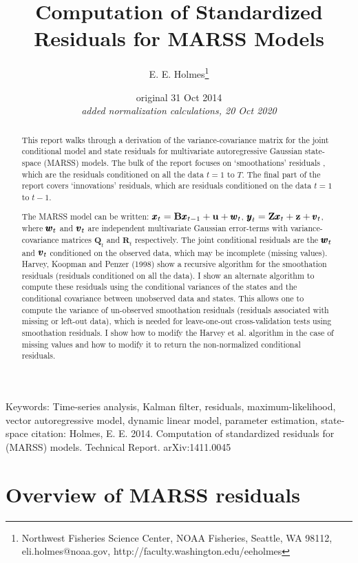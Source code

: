 \documentclass[]{article}
\def\UPS{\mbox{\boldmath $\Upsilon$}}
\def\XI{\mbox{\boldmath $\Xi$}}
\def\BB{\mbox{$\mathbf B$}}	\def\bb{\mbox{$\mathbf b$}} \def\Bb{\mbox{$\mathbf J$}} \def\Ba{\mbox{$\mathbf L$}} \def\Bm{\UPS}
\def\QQ{\mbox{$\mathbf Q$}}	 \def\qq{\mbox{$\mathbf q$}} \def\Qb{\mbox{$\mathbf G$}}  \def\Qm{\mathbb{Q}}
\def\RR{\mbox{$\mathbf R$}}	 \def\rr{\mbox{$\mathbf r$}} \def\Rb{\mbox{$\mathbf H$}}	\def\Rm{\mathbb{R}}
\def\ZZ{\mbox{$\mathbf Z$}}	\def\zz{\mbox{$\mathbf z$}}	\def\Zb{\mbox{$\mathbf M$}} \def\Za{\mbox{$\mathbf N$}} \def\Zm{\XI}
\begin{document}

\author{E. E. Holmes\footnote{Northwest Fisheries Science Center, NOAA Fisheries, Seattle, WA 98112, 
       eli.holmes@noaa.gov, http://faculty.washington.edu/eeholmes}}
\title{Computation of Standardized Residuals for MARSS Models}
\date{original 31 Oct 2014 \\ 
\small{\emph{added normalization calculations, 20 Oct 2020}}}
\maketitle
\begin{abstract}
This report walks through a derivation of the variance-covariance matrix for the joint conditional model and state residuals for multivariate autoregressive Gaussian state-space (MARSS) models. The bulk of the report focuses on `smoothations' residuals \citep{Harveyetal1998}, which are the residuals conditioned on all the data $t=1$ to $T$. The final part of the report covers `innovations' residuals, which are residuals conditioned on the data $t=1$ to $t-1$. 

The MARSS model can be written: $\xx_t=\BB\xx_{t-1}+\uu+\ww_t$, $\yy_t=\ZZ\xx_t+\zz+\vv_t$, where $\mbox{$\pmb{w}$}_t$ and $\mbox{$\pmb{v}$}_t$ are independent multivariate Gaussian error-terms with variance-covariance matrices $\QQ_t$ and $\RR_t$ respectively. The joint conditional residuals are the $\mbox{$\pmb{w}$}_t$ and $\mbox{$\pmb{v}$}_t$ conditioned on the observed data, which may be incomplete (missing values). Harvey, Koopman and Penzer (1998) show a recursive algorithm for the smoothation residuals (residuals conditioned on all the data). I show an alternate algorithm to compute these residuals using the conditional variances of the states and the conditional covariance between unobserved data and states. This allows one to compute the variance of un-observed smoothation residuals (residuals associated with missing or left-out data), which is needed for leave-one-out cross-validation tests using smoothation residuals. I show how to modify the Harvey et al. algorithm in the case of missing values and how to modify it to return the non-normalized conditional residuals.
\end{abstract}
Keywords: Time-series analysis, Kalman filter, residuals, maximum-likelihood, vector autoregressive model, dynamic linear model, parameter estimation, state-space
\vfill
{\noindent \small citation: Holmes, E. E. 2014. Computation of standardized residuals for (MARSS) models. Technical Report. arXiv:1411.0045 }
 \newpage
 
\section{Overview of MARSS residuals}
\end{document}
